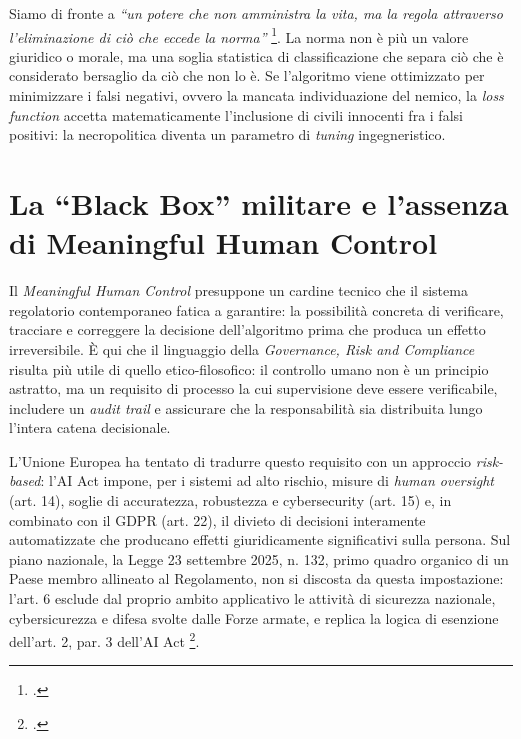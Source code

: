 \documentclass[a4paper,12pt]{report}
\begin{document}
Siamo di fronte a \textit{``un potere che non amministra la vita, ma la regola
attraverso l'eliminazione di ciò che eccede la norma''} \footcite{buffa_2025}. La
norma non è più un valore giuridico o morale, ma una soglia statistica di
classificazione che separa ciò che è considerato bersaglio da ciò che non lo è.
Se l'algoritmo viene ottimizzato per minimizzare i falsi negativi, ovvero la
mancata individuazione del nemico, la \textit{loss function} accetta
matematicamente l'inclusione di civili innocenti fra i falsi positivi: la
necropolitica diventa un parametro di \textit{tuning} ingegneristico.

\section{La ``Black Box'' militare e l'assenza di Meaningful Human Control}

Il \textit{Meaningful Human Control} presuppone un cardine tecnico che il sistema
regolatorio contemporaneo fatica a garantire: la possibilità concreta di
verificare, tracciare e correggere la decisione dell'algoritmo prima che produca
un effetto irreversibile. È qui che il linguaggio della \textit{Governance, Risk
and Compliance} risulta più utile di quello etico-filosofico: il controllo umano
non è un principio astratto, ma un requisito di processo la cui supervisione deve
essere verificabile, includere un \textit{audit trail} e assicurare che la
responsabilità sia distribuita lungo l'intera catena decisionale.

L'Unione Europea ha tentato di tradurre questo requisito con un approccio
\textit{risk-based}: l'AI Act impone, per i sistemi ad alto rischio, misure di
\textit{human oversight} (art. 14), soglie di accuratezza, robustezza e
cybersecurity (art. 15) e, in combinato con il GDPR (art. 22), il divieto di
decisioni interamente automatizzate che producano effetti giuridicamente
significativi sulla persona. Sul piano nazionale, la Legge 23 settembre 2025, n.
132, primo quadro organico di un Paese membro allineato al Regolamento, non si
discosta da questa impostazione: l'art. 6 esclude dal proprio ambito applicativo
le attività di sicurezza nazionale, cybersicurezza e difesa svolte dalle Forze
armate, e replica la logica di esenzione dell'art. 2, par. 3 dell'AI Act
\footcite{legge_132_2025}.
\end{document}
